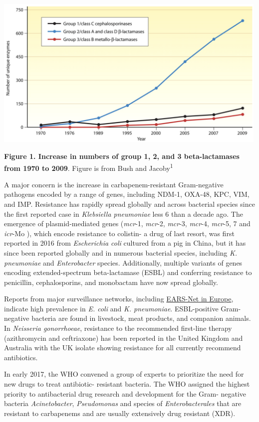 \documentclass[
]{book}
\begin{document}
\includegraphics[width=5.20833in,height=\textheight]{images/betalactamases.png}

\textbf{Figure 1. Increase in numbers of group 1, 2, and 3 beta-lactamases from 1970 to 2009}. Figure is from Bush and Jacoby\textsuperscript{1}

A major concern is the increase in carbapenem-resistant Gram-negative pathogens encoded by a range of genes, including NDM-1, OXA-48, KPC, VIM, and IMP. Resistance has rapidly spread globally and across bacterial species since the first reported case in \emph{Klebsiella pneumoniae} less 6 than a decade ago. The emergence of plasmid-mediated genes (\emph{mcr}-1, \emph{mcr}-2, \emph{mcr}-3, \emph{mcr}-4, \emph{mcr}-5, 7 and \emph{icr}-Mo ), which encode resistance to colistin- a drug of last resort, was first reported in 2016 from \emph{Escherichia coli} cultured from a pig in China, but it has since been reported globally and in numerous bacterial species, including \emph{K. pneumoniae} and \emph{Enterobacter} species. Additionally, multiple variants of genes encoding extended-spectrum beta-lactamase (ESBL) and conferring resistance to penicillin, cephalosporins, and monobactam have now spread globally.

Reports from major surveillance networks, including \href{https://atlas.ecdc.europa.eu/public/index.aspx}{EARS-Net in Europe}, indicate high prevalence in \emph{E. coli} and \emph{K. pneumoniae}. ESBL-positive Gram-negative bacteria are found in livestock, meat products, and companion animals. In \emph{Neisseria gonorrhoeae}, resistance to the recommended first-line therapy (azithromycin and ceftriaxone) has been reported in the United Kingdom and Australia with the UK isolate showing resistance for all currently recommend antibiotics.

In early 2017, the WHO convened a group of experts to prioritize the need for new drugs to treat antibiotic- resistant bacteria. The WHO assigned the highest priority to antibacterial drug research and development for the Gram- negative bacteria \emph{Acinetobacter}, \emph{Pseudomonas} and species of \emph{Enterobacterales} that are resistant to carbapenems and are usually extensively drug resistant (XDR).
\end{document}
